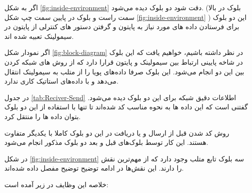 اگر به شکل 
\ref{fig:inside-environment}
دقت شود دو بلوک 
دیده می‌شود. (بلوک 
در بالا سمت راست و بلوک 
در پایین سمت چپ شکل 
\ref{fig:inside-environment}
)
این دو بلوک برای فرستادن داده های مورد نیاز به پایتون و گرفتن دستور های کنترلی از پایتون در سیمولینک تعبیه شده اند.

\begin{note}
	
اگر نمودار شکل
\ref{fig:block-diagram}
در نظر داشته باشیم، خواهیم یافت که این بلوک در شاخه پایینی ارتباط بین سیمولینک و پایتون قرارا دارد که از روش های شبکه کردن بین این دو انجام می‌شود. این بلوک صرفا داده‌های پویا را از متلب به سیمولینک انتقال می‌دهد و با داده‌های استاتیک کاری ندارد. 

\end{note}

 در جدول
\ref{tab:Reciver-Send}
 اطلاعات دقیق شبکه برای این دو بلوک دیده می‌شود. گفتنی است که این داده ها به نحوه مناسب کد شده‌اند تا تنها با استفاده از این دو بلوک بتوان داده ها را منتقل کرد.


\begin{table}
	\caption{اطلاعات بلوک های فرستندگی گیرندگی در سیمولینک}
	\label{tab:Reciver-Send}
\end{table}


روش کد شدن
قبل از ارسال و یا دریافت در این دو بلوک کاملا با یکدیگر متفاوت هستند. این کار توسط بلوک‌های قبل و بعد دو بلوک مذکور انجام می‌شود. 



در شکل 
\ref{fig:inside-environment}
سه بلوک تابع متلب 
   وجود دارد که از مهم‌ترین نقش را دارند. این نقش‌ها در ادامه توضیح توضیح مفصل داده شده‌اند.
   
   خلاصه این وظایف در زیر آمده است:
   
